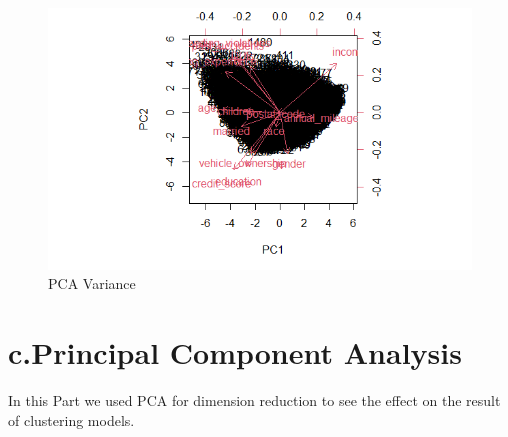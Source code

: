 \documentclass[a4paper, 11pt]{article}
\begin{document}
\begin{figure}[H]
\hfill
\begin{minipage}[b]{.4\textwidth}
	\includegraphics[width=\textwidth]{figure20.png}
	\caption{PCA Variance }
\end{minipage}
\end{figure}
\section*{c.Principal Component Analysis}	
In this Part we used PCA for dimension reduction to see the effect on the result of clustering models.
\end{document}

